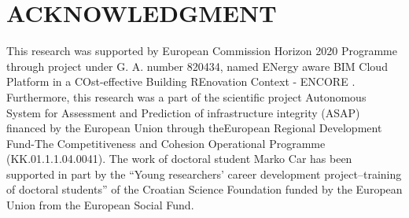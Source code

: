 \documentclass[letterpaper, 10 pt, conference]{ieeeconf}  %
\begin{document}
\section*{ACKNOWLEDGMENT}
This research was supported by European Commission Horizon 2020 Programme through project under G. A. number 820434, named ENergy aware BIM Cloud Platform in a COst-effective Building REnovation Context - ENCORE \cite{ENCOREweb}. Furthermore, this research was a part of the scientific project Autonomous System for Assessment and Prediction of infrastructure integrity (ASAP) \cite{ASAPweb} financed by the European Union through theEuropean Regional Development Fund-The Competitiveness and Cohesion Operational Programme (KK.01.1.1.04.0041). The work of doctoral student Marko Car has been supported in part by the “Young researchers’ career development project--training of doctoral students” of the Croatian Science Foundation funded by the European Union from the European Social Fund.


%








\end{document}
